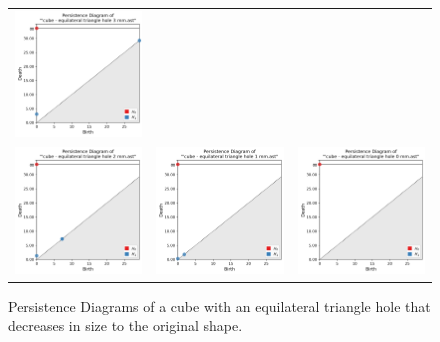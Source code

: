 \documentclass[ma]{uncgdissertationexp}
\theoremstyle{plain}
\theoremstyle{definition}
\theoremstyle{remark}
\begin{document}
\begin{figure}[H]
\begin{center}
\begin{tabular}{ccc}
         \includegraphics[width=1.875in]{Final Run, (cube - equilateral triangle hole 3 mm) persdia.png} \\
         \includegraphics[width=1.875in]{Final Run, (cube - equilateral triangle hole 2 mm) persdia.png} & 
         \includegraphics[width=1.875in]{Final Run, (cube - equilateral triangle hole 1 mm) persdia.png} & 
         \includegraphics[width=1.875in]{Final Run, (cube - equilateral triangle hole 0 mm) persdia.png} \\
    \end{tabular}
    \end{center}
    \caption{Persistence Diagrams of a cube with an equilateral triangle hole that decreases in size to the original shape.}
    \label{fig:cube_triangle_hole_persdia_table}
\end{figure}
\end{document}
